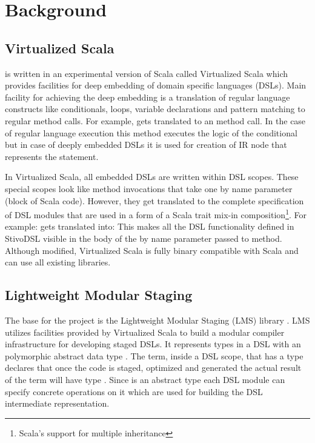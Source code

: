 \section{Background}
\label{sec:background}

\subsection{Virtualized Scala}
\label{subsec:virtualized-scala}
\tool is written in an experimental version of Scala called Virtualized Scala \cite{moors_scala-virtualized_2012} which provides facilities for deep embedding of domain specific languages (DSLs). Main facility for achieving the deep embedding is a translation of regular language constructs like conditionals, loops, variable declarations and pattern matching to regular method calls. For example,  gets translated to an  method call. In the case of regular language execution this method executes the logic of the conditional but in case of deeply embedded DSLs it is used for creation of IR node that represents the  statement.  

In Virtualized Scala, all embedded DSLs are written within DSL scopes. These special scopes look like method invocations that take one by name parameter (block of Scala code). However, they get translated to the complete specification of DSL modules that are used in a form of a Scala trait mix-in composition\footnote[1]{Scala's support for multiple inheritance}. For example: 
 gets translated into:
This makes all the DSL functionality defined in StivoDSL visible in the body of the by name parameter passed to \tool method. 
Although modified, Virtualized Scala is fully binary compatible with Scala and can use all existing libraries.  


\subsection{Lightweight Modular Staging}
\label{subsec:lightweight-modular-staging}

The base for the \tool project is the Lightweight Modular Staging (LMS) library \cite{rompf_lightweight_2010, rompf_lightweight_2012}. LMS utilizes facilities provided by Virtualized Scala to build a modular compiler infrastructure for developing staged DSLs. It represents types in a DSL with an polymorphic abstract data type . The term, inside a DSL scope, that has a type  declares that once the code is staged, optimized and generated the actual result of the term will have type .  Since  is an abstract type each DSL module can specify concrete operations on it which are used for building the DSL intermediate representation. 

